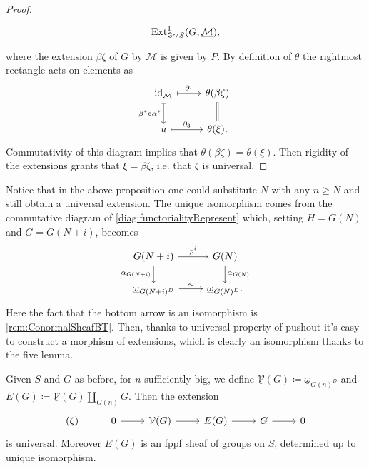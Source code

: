 \begin{proof}
\begin{equation*}
\begin{tikzcd}
		\operatorname{Ext}^1_{\mathsf{Gr}/S}
		(G,\underline{\mathcal{M}})
	,\end{tikzcd}
	\end{equation*}
	where the extension $\beta\zeta$ of $G$ by $\underline{\mathcal{M}}$ is given by $P$.
	By definition of $\theta$ the rightmost rectangle acts on elements as
	\begin{equation*}
	\begin{tikzcd}
		\id_{ \underline{\mathcal{M}} }
		\arrow[r, "\partial_1", mapsto] 
		\arrow[d, "\beta^* \circ \alpha^*"', mapsto] &
		\theta(\beta\zeta)
		\arrow[d, "", equal] \\
		u \arrow[r, "\partial_3", mapsto] &
		\theta(\xi)
	.\end{tikzcd}
	\end{equation*}
	Commutativity of this diagram implies that $\theta(\beta\zeta) = \theta(\xi)$.
	Then rigidity of the extensions grants that $\xi = \beta\zeta$, i.e.
	that $\zeta$ is universal.
\end{proof}


\begin{rem}
	Notice that in the above proposition one could substitute
	$N$ with any $n \geq N$ and still obtain a universal extension.
	The unique isomorphism comes from the commutative diagram
	of \cref{diag:functorialityRepresent}
	which, setting $H = G(N)$ and $G = G(N+i)$, becomes
	\begin{equation*}
	\begin{tikzcd}
		G(N+i) \arrow[r, "p^i", rightarrow] 
		\arrow[d, "\alpha_{G(N+i)}"', rightarrow] &
		G(N) \arrow[d, "\alpha_{G(N)}", rightarrow] \\
		\underline{\omega}_{G(N+i)^D} \arrow[r, "\sim", rightarrow] &
		\underline{\omega}_{G(N)^D}
	.\end{tikzcd}
	\end{equation*}
	Here the fact that the bottom arrow is an isomorphism
	is \cref{rem:ConormalSheafBT}.
	Then, thanks to universal property of pushout it's easy to construct
	a morphism of extensions, which is clearly an isomorphism
	thanks to the five lemma.
\end{rem}


\begin{defn}[]
	Given $S$ and $G$ as before, for $n$ sufficiently big, we define
	$\underline{\mathcal{V}}(G) \coloneqq \underline{\omega}_{G(n)^D}$ and
	$E(G) \coloneqq \underline{\mathcal{V}}(G) \amalg_{G(n)} G$.
	Then the extension
	\begin{equation*}
	\begin{tikzcd}
		(\zeta) &
		0 \arrow[r, "", rightarrow] &
		\underline{\mathcal{V}}(G) \arrow[r, "", rightarrow] &
		E(G) \arrow[r, "", rightarrow] &
		G \arrow[r, "", rightarrow] &
		0
	\end{tikzcd}
	\end{equation*}
	is universal.
	Moreover $E(G)$ is an fppf sheaf of groups on $S$,
	determined up to unique isomorphism.
\end{defn}



